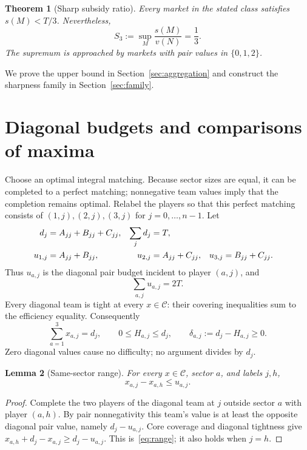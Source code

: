 \documentclass[11pt]{article}
\newtheorem{theorem}{Theorem}[section]
\newtheorem{lemma}[theorem]{Lemma}
\theoremstyle{remark}
\newcommand{\core}{\mathcal C}
\begin{document}
\begin{theorem}[Sharp subsidy ratio]\label{thm:main}
Every market in the stated class satisfies $s(M)<T/3$. Nevertheless,
\begin{equation}\label{eq:sharp}
             S_3:=\sup_M\frac{s(M)}{v(N)}=\frac13.
\end{equation}
The supremum is approached by markets with pair values in $\{0,1,2\}$.
\end{theorem}
We prove the upper bound in Section~\ref{sec:aggregation} and construct the
sharpness family in Section~\ref{sec:family}.

\section{Diagonal budgets and comparisons of maxima}\label{sec:comparisons}
Choose an optimal integral matching. Because sector sizes are equal, it
can be completed to a perfect matching; nonnegative team values imply
that the completion remains optimal. Relabel the players so that this
perfect matching consists of $(1,j),(2,j),(3,j)$ for $j=0,\ldots,n-1$.
Let
\begin{align}
 d_j&=A_{jj}+B_{jj}+C_{jj}, &\sum_jd_j&=T,\label{eq:diagonal}\\
 u_{1,j}&=A_{jj}+B_{jj},&u_{2,j}&=A_{jj}+C_{jj},
 &u_{3,j}&=B_{jj}+C_{jj}.\notag
\end{align}
Thus $u_{a,j}$ is the diagonal pair budget incident to player $(a,j)$, and
\begin{equation}\label{eq:budget}
                     \sum_{a,j}u_{a,j}=2T.
\end{equation}
Every diagonal team is tight at every $x\in\core$: their covering
inequalities sum to the efficiency equality. Consequently
\begin{equation}\label{eq:caps}
     \sum_{a=1}^3x_{a,j}=d_j,\qquad
     0\le H_{a,j}\le d_j,\qquad
     \delta_{a,j}:=d_j-H_{a,j}\ge0.
\end{equation}
Zero diagonal values cause no difficulty; no argument divides by $d_j$.

\begin{lemma}[Same-sector range]\label{lem:range}
For every $x\in\core$, sector $a$, and labels $j,h$,
\begin{equation}\label{eq:range}
                         x_{a,j}-x_{a,h}\le u_{a,j}.
\end{equation}
\end{lemma}
\begin{proof}
Complete the two players of the diagonal team at $j$ outside sector $a$
with player $(a,h)$. By pair nonnegativity this team's value is at least
the opposite diagonal pair value, namely $d_j-u_{a,j}$.
Core coverage and diagonal tightness give
$x_{a,h}+d_j-x_{a,j}\ge d_j-u_{a,j}$.
This is~\eqref{eq:range}; it also holds when $j=h$.
\end{proof}
\end{document}
